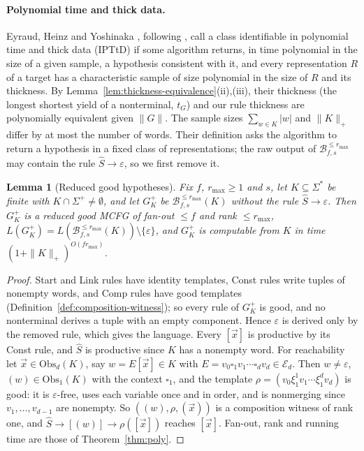 \documentclass[11pt]{article}
\numberwithin{equation}{section}
\theoremstyle{plain}
\newtheorem{lemma}[theorem]{Lemma}
\theoremstyle{definition}
\theoremstyle{remark}
\newcommand{\tuple}[1]{\vec{#1}}
\newcommand{\blank}{\square}
\newcommand{\eps}{\varepsilon}
\theoremstyle{plain}
\begin{document}
\paragraph{Polynomial time and thick data.}
Eyraud, Heinz and Yoshinaka \cite[Definition~2.12]{EyraudHeinzYoshinaka2016},
following \cite{Yoshinaka2008}, call a class identifiable in polynomial time and
thick data (IPTtD) if some algorithm returns, in time polynomial in the size of
a given sample, a hypothesis consistent with it, and every representation $R$
of a target has a characteristic sample of size polynomial in the size of $R$
and its thickness.  By Lemma~\ref{lem:thickness-equivalence}(ii),(iii), their
thickness (the longest shortest yield of a nonterminal, $t_G$) and our rule
thickness are polynomially equivalent given $\|G\|$.  The sample sizes
$\sum_{w\in K}|w|$ and $\|K\|_+$ differ by at most the number of words.  Their
definition asks the algorithm to return a hypothesis in a fixed class of
representations; the raw output of $\mathcal B^{\le r_{\max}}_{f,s}$ may contain
the rule $\widehat S\to\eps$, so we first remove it.

\begin{lemma}[Reduced good hypotheses]
\label{lem:reduced-good-hypothesis}
Fix $f$, $r_{\max}\ge1$ and $s$, let $K\subseteq\Sigma^*$ be finite with
$K\cap\Sigma^+\ne\emptyset$, and let $G^+_K$ be
$\mathcal B^{\le r_{\max}}_{f,s}(K)$ without the rule $\widehat S\to\eps$.  Then
$G^+_K$ is a reduced good MCFG of fan-out $\le f$ and rank $\le r_{\max}$,
$L(G^+_K)=L(\mathcal B^{\le r_{\max}}_{f,s}(K))\setminus\{\eps\}$, and $G^+_K$ is
computable from $K$ in time $(1+\|K\|_+)^{O(fr_{\max})}$.
\end{lemma}

\begin{proof}
Start and Link rules have identity templates, Const rules write tuples of
nonempty words, and Comp rules have good templates
(Definition~\ref{def:composition-witness}); so every rule of $G^+_K$ is good, and
no nonterminal derives a tuple with an empty component.  Hence $\eps$ is derived
only by the removed rule, which gives the language.  Every $[\tuple x]$ is
productive by its Const rule, and $\widehat S$ is productive since $K$ has a
nonempty word.  For reachability let $\tuple x\in\mathrm{Obs}_d(K)$, say
$w=E[\tuple x]\in K$ with $E=v_0\blank_1v_1\cdots\blank_dv_d\in\mathcal E_d$.  Then $w\ne\eps$,
$(w)\in\mathrm{Obs}_1(K)$ with the context $\blank_1$, and the template
$\rho=(v_0\xi_1^1v_1\cdots\xi_1^dv_d)$ is good: it is $\eps$-free, uses each
variable once and in order, and is nonmerging since $v_1,\ldots,v_{d-1}$ are
nonempty.  So $((w),\rho,(\tuple x))$ is a composition witness of rank one, and
$\widehat S\to[(w)]\to\rho([\tuple x])$ reaches $[\tuple x]$.  Fan-out, rank and
running time are those of Theorem~\ref{thm:poly}.
\end{proof}
\end{document}
